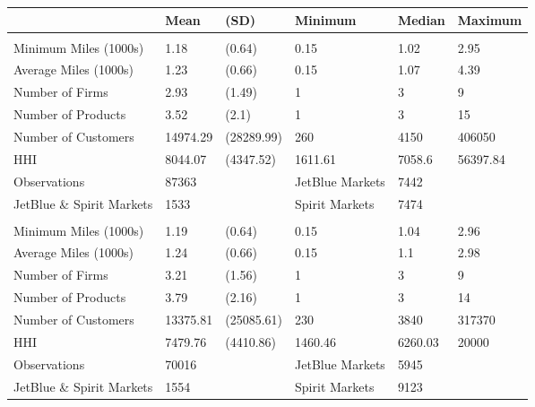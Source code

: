 
\begin{tabular}[t]{llllll}
\toprule
 & Mean & (SD) & Minimum & Median & Maximum\\
\midrule
\addlinespace[0.3em]
\multicolumn{6}{l}{\textbf{Pre-Pandemic}}\\
\hspace{1em}Minimum Miles (1000s) & 1.18 & (0.64) & 0.15 & 1.02 & 2.95\\
\hspace{1em}Average Miles (1000s) & 1.23 & (0.66) & 0.15 & 1.07 & 4.39\\
\hspace{1em}Number of Firms & 2.93 & (1.49) & 1 & 3 & 9\\
\hspace{1em}Number of Products & 3.52 & (2.1) & 1 & 3 & 15\\
\hspace{1em}Number of Customers & 14974.29 & (28289.99) & 260 & 4150 & 406050\\
\hspace{1em}HHI & 8044.07 & (4347.52) & 1611.61 & 7058.6 & 56397.84\\
\midrule
\hspace{1em}Observations & 87363 &  & JetBlue Markets & 7442 & \\
\hspace{1em}JetBlue \& Spirit Markets & 1533 &  & Spirit Markets & 7474 & \\
\midrule
\addlinespace[0.3em]
\multicolumn{6}{l}{\textbf{Post-Pandemic}}\\
\hspace{1em}Minimum Miles (1000s) & 1.19 & (0.64) & 0.15 & 1.04 & 2.96\\
\hspace{1em}Average Miles (1000s) & 1.24 & (0.66) & 0.15 & 1.1 & 2.98\\
\hspace{1em}Number of Firms & 3.21 & (1.56) & 1 & 3 & 9\\
\hspace{1em}Number of Products & 3.79 & (2.16) & 1 & 3 & 14\\
\hspace{1em}Number of Customers & 13375.81 & (25085.61) & 230 & 3840 & 317370\\
\hspace{1em}HHI & 7479.76 & (4410.86) & 1460.46 & 6260.03 & 20000\\
\midrule
\hspace{1em}Observations & 70016 &  & JetBlue Markets & 5945 & \\
\hspace{1em}JetBlue \& Spirit Markets & 1554 &  & Spirit Markets & 9123 & \\
\bottomrule
\end{tabular}
